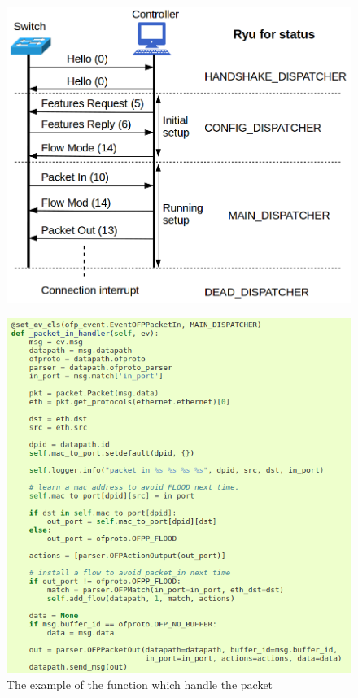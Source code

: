 \documentclass[a4paper,12pt]{report}
\begin{document}
\begin{large}
\begin{figure}[p]
          	\includegraphics[width=1.0\textwidth]{ryu_graph.png}
          
      	\end{figure}
     \begin{figure}[p]
          \centering
          \caption{The example of the function which handle the packet}
          	\includegraphics[width=1.0\textwidth]{packet_in_handler.png}
      	\end{figure}

\end{large}
\end{document}
